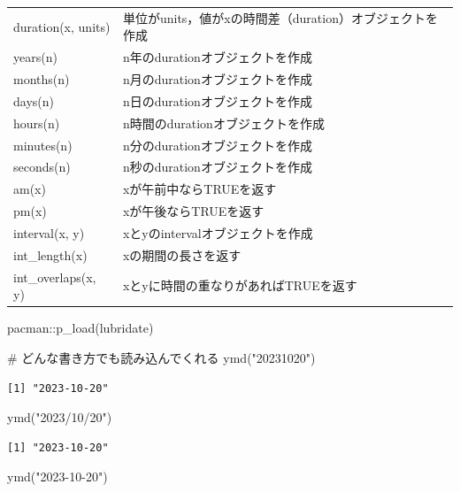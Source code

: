 \documentclass[
  letterpaper,
  DIV=11,
  numbers=noendperiod]{scrreprt}
\newenvironment{Shaded}{\begin{snugshade}}{\end{snugshade}}
\newcommand{\CommentTok}[1]{\textcolor[rgb]{0.37,0.37,0.37}{#1}}
\newcommand{\FunctionTok}[1]{\textcolor[rgb]{0.28,0.35,0.67}{#1}}
\newcommand{\NormalTok}[1]{\textcolor[rgb]{0.00,0.23,0.31}{#1}}
\newcommand{\SpecialCharTok}[1]{\textcolor[rgb]{0.37,0.37,0.37}{#1}}
\newcommand{\StringTok}[1]{\textcolor[rgb]{0.13,0.47,0.30}{#1}}
\begin{document}
\begin{longtable}[]{@{}
  >{\raggedright\arraybackslash}p{}
  >{\raggedright\arraybackslash}p{}@{}}
duration(x, units) &
単位がunits，値がxの時間差（duration）オブジェクトを作成 \\
years(n) & n年のdurationオブジェクトを作成 \\
months(n) & n月のdurationオブジェクトを作成 \\
days(n) & n日のdurationオブジェクトを作成 \\
hours(n) & n時間のdurationオブジェクトを作成 \\
minutes(n) & n分のdurationオブジェクトを作成 \\
seconds(n) & n秒のdurationオブジェクトを作成 \\
am(x) & xが午前中ならTRUEを返す \\
pm(x) & xが午後ならTRUEを返す \\
interval(x, y) & xとyのintervalオブジェクトを作成 \\
int\_length(x) & xの期間の長さを返す \\
int\_overlaps(x, y) & xとyに時間の重なりがあればTRUEを返す \\
\bottomrule()
\end{longtable}

\begin{Shaded}
\begin{Highlighting}[]
\NormalTok{pacman}\SpecialCharTok{::}\FunctionTok{p\_load}\NormalTok{(lubridate)}

\CommentTok{\# どんな書き方でも読み込んでくれる}
\FunctionTok{ymd}\NormalTok{(}\StringTok{"20231020"}\NormalTok{)}
\end{Highlighting}
\end{Shaded}

\begin{verbatim}
[1] "2023-10-20"
\end{verbatim}

\begin{Shaded}
\begin{Highlighting}[]
\FunctionTok{ymd}\NormalTok{(}\StringTok{"2023/10/20"}\NormalTok{)}
\end{Highlighting}
\end{Shaded}

\begin{verbatim}
[1] "2023-10-20"
\end{verbatim}

\begin{Shaded}
\begin{Highlighting}[]
\FunctionTok{ymd}\NormalTok{(}\StringTok{"2023{-}10{-}20"}\NormalTok{)}
\end{Highlighting}
\end{Shaded}
\end{document}

